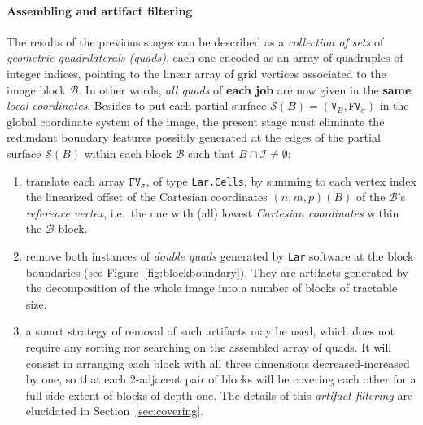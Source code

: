 \paragraph{Assembling and artifact filtering} 
The results of the previous stages can be described as a \emph{collection of sets} of \emph{geometric quadrilaterals (quads)}, each one encoded as an array of quadruples of integer indices, pointing to the linear array of grid vertices associated to the image block $\mathcal{B}$.  In other words, \emph{all quads} of \textbf{each job} are now given in the \textbf{same} \emph{local coordinates}.  Besides to put each partial surface $\mathcal{S}(B) = (\texttt{V}_B, \texttt{FV}_\sigma)$ in the global coordinate system of the image, the present stage must eliminate the redundant boundary features possibly generated at the edges of the partial surface $\mathcal{S}(B)$ within each block $\mathcal{B}$ such that $B \cap \mathcal{I} \not= \emptyset$:
\begin{enumerate}

\item translate each array $\mathtt{FV}_\sigma$, of type \texttt{Lar.Cells}, by summing to each vertex index the linearized offset of the Cartesian coordinates $(n,m,p)(B)$ of the $\mathcal{B}$'s \emph{reference vertex}, i.e.~the one with (all) lowest \emph{Cartesian coordinates} within the $\mathcal{B}$ block.

\item remove both instances of \emph{double quads} generated by \texttt{Lar} software at the block boundaries (see Figure~\ref{fig:blockboundary}). They are artifacts generated by the decomposition of the whole image into a number of blocks of tractable size.

\item 
a smart strategy of removal of such artifacts may be used, which does not require any sorting nor searching on the assembled array of quads. It will consist in arranging each block with all three dimensions decreased-increased by one, so that each 2-adjacent pair of blocks will be covering each other for a full side extent of blocks of depth one. The details of this \emph{artifact filtering} are elucidated in Section~\ref{sec:covering}.

\end{enumerate}

